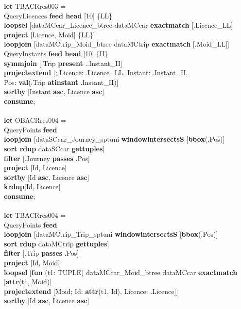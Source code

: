 \documentclass[a4paper]{article}
\newcommand{\op}[1]{\textbf{#1}}
\begin{document}
\begin{scriptsize}
\begin{tabbing}
\op{let} TBACRres003 =\\
\>QueryLicences \op{feed head} [10] \{LL\}\\
\>\>\op{loopsel} [dataMCcar\_Licence\_btree dataMCcar \op{exactmatch} [.Licence\_LL]\\
\>\>\>\op{project} [Licence, Moid] \{LL\}]\\
\>\>\op{loopjoin} [dataMCtrip\_Moid\_btree dataMCtrip \op{exactmatch} [.Moid\_LL]]\\
\>QueryInstants \op{feed head} [10] \{II\}\\
\>\op{symmjoin} [.Trip \op{present} ..Instant\_II]\\
\>\op{projectextend} [; Licence: .Licence\_LL, Instant: .Instant\_II,\\
\>\>\>\>Pos: \op{val}(.Trip \op{atinstant} .Instant\_II)]\\
\>\op{sortby} [Instant \op{asc}, Licence \op{asc}]\\
\op{consume};\\
\\
\op{let} OBACRres004 =\\
\>QueryPoints \op{feed}\\
\>\op{loopjoin} [dataSCcar\_Journey\_sptuni \op{windowintersectsS} [\op{bbox}(.Pos)]\\
\>\>\op{sort rdup} dataSCcar \op{gettuples}]\\
\>\op{filter} [.Journey \op{passes} .Pos]\\
\>\op{project} [Id, Licence]\\
\>\op{sortby} [Id \op{asc}, Licence \op{asc}]\\
\>\op{krdup}[Id, Licence]\\
\op{consume};\\
\\
\op{let} TBACRres004 =\\
\>QueryPoints \op{feed}\\
\>\op{loopjoin} [dataMCtrip\_Trip\_sptuni \op{windowintersectsS} [\op{bbox}(.Pos)]\\
\>\>\op{sort rdup} dataMCtrip \op{gettuples}]\\
\>\op{filter} [.Trip \op{passes} .Pos]\\
\>\op{project} [Id, Moid]\\
\>\op{loopsel} [\op{fun} (t1: TUPLE) dataMCcar\_Moid\_btree dataMCcar \op{exactmatch} [\op{attr}(t1, Moid)]\\
\>\>\op{projectextend} [Moid; Id: \op{attr}(t1, Id), Licence: .Licence]]\\
\>\op{sortby} [Id \op{asc}, Licence \op{asc}]\\

\end{tabbing}
\end{scriptsize}
\end{document}
